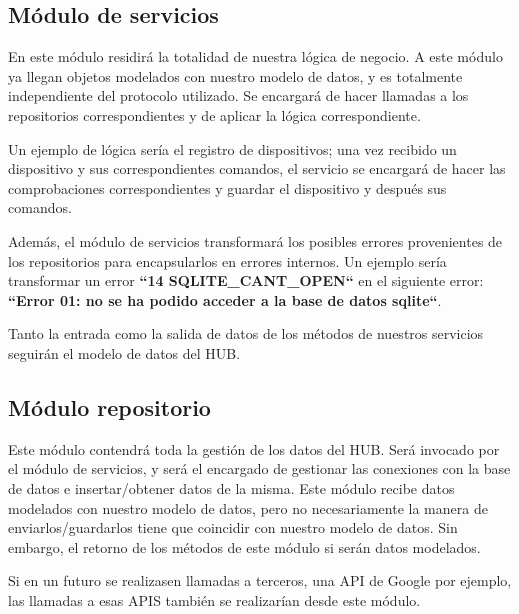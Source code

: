\subsection{Módulo de servicios}
En este módulo residirá la totalidad de nuestra lógica de negocio. A este módulo ya llegan objetos modelados con nuestro modelo de datos, y es totalmente
independiente del protocolo utilizado. Se encargará de hacer llamadas a los repositorios correspondientes y de aplicar la lógica correspondiente.
\par
Un ejemplo de lógica sería el registro de dispositivos; una vez recibido un dispositivo y sus correspondientes comandos, el servicio se encargará de hacer
las comprobaciones correspondientes y guardar el dispositivo y después sus comandos.
\par
Además, el módulo de servicios transformará los posibles errores provenientes de los repositorios para encapsularlos en errores internos. Un ejemplo sería
transformar un error \textbf{``14 SQLITE\_CANT\_OPEN``} en el siguiente error: \textbf{``Error 01: no se ha podido acceder a la base de datos sqlite``}.
\par
Tanto la entrada como la salida de datos de los métodos de nuestros servicios seguirán el modelo de datos del HUB.
\subsection{Módulo repositorio}
Este módulo contendrá toda la gestión de los datos del HUB. Será invocado por el módulo de servicios, y 
será el encargado de gestionar las conexiones con la base de datos e insertar/obtener datos de la misma.
Este módulo recibe datos modelados con nuestro modelo de datos, pero no necesariamente la manera de enviarlos/guardarlos tiene que coincidir con nuestro modelo 
de datos. Sin embargo, el retorno de los métodos de este módulo si serán datos modelados.
\par
Si en un futuro se realizasen llamadas a terceros, una API de Google por ejemplo, las llamadas a esas APIS también se realizarían desde este módulo.
